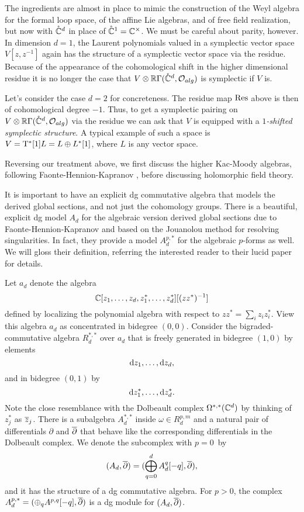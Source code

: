 \documentclass[11pt]{amsart}
\begin{document}
The ingredients are almost in place to mimic the construction of the Weyl algebra for the formal loop space, of the affine Lie algebras, and of free field realization, but now with $\mathring{\mathbb C}^d$ in place of $\mathring{\mathbb C}^1 = \mathbb C^\times$.
We must be careful about parity, however. 
In dimension $d = 1$, the Laurent polynomials valued in a symplectic vector space $V[z,z^{-1}]$ again has the structure of a symplectic vector space via the residue. 
Because of the appearance of the cohomological shift in the higher dimensional residue it is no longer the case that $V \otimes \mathbb R\Gamma(\mathring{\mathbb C}^d, \mathcal O_{alg})$ is symplectic if $V$ is.

Let's consider the case $d = 2$ for concreteness. 
The residue map ${\rm Res}$ above is then of cohomological degree $-1$. 
Thus, to get a symplectic pairing on $V \otimes \mathbb R\Gamma(\mathring{\mathbb C}^d, \mathcal O_{alg})$ via the residue we can ask that $V$ is equipped with a {\em $1$-shifted symplectic structure}. 
A typical example of such a space is $V = {\rm T}^*[1] L = L \oplus L^*[1]$, where $L$ is any vector space.

Reversing our treatment above, we first discuss the higher Kac-Moody algebras, 
following Faonte-Hennion-Kapranov \cite{FHK},
before discussing holomorphic field theory.

It is important to have an explicit dg commutative algebra that models the derived global sections,
and not just the cohomology groups.
There is a beautiful, explicit dg model $A_d$ for the algebraic version derived global sections due to Faonte-Hennion-Kapranov \cite{FHK} and based on the Jouanolou method for resolving singularities. 
In fact, they provide a model $A^{p,*}_d$ for the algebraic $p$-forms as well.
We will gloss their definition, referring the interested reader to their lucid paper for details.

Let $a_d$ denote the algebra  
\[
\mathbb C[z_1,\ldots,z_d, z_1^*,\ldots,z_d^*][(z z^*)^{-1}]
\]
defined by localizing the polynomial algebra with respect to $zz^* = \sum_i z_i z^*_i$.
View this algebra $a_d$ as concentrated in bidegree $(0,0)$.
Consider the bigraded-commutative algebra $R^{*,*}_d$ over $a_d$ that is freely generated in bidegree $(1,0)$ by elements
\[
{\rm d} z_1,\ldots , {\rm d} z_d,
\] 
and in bidegree $(0,1)$ by
\[
{\rm d} z_1^*,\ldots, {\rm d} z_d^*.
\]
Note the close resemblance with the Dolbeault complex $\Omega^{*,*}(\mathbb C^d)$ by thinking of $z_j^*$ as ${\overline{z}}_j$.
There is a subalgebra $A^{*,*}_d$ inside $\omega \in R^{p,m}_d$ and a natural pair of differentials $\partial$ and ${\overline{\partial}}$ that behave like the corresponding differentials in the Dolbeault complex.
We denote the subcomplex with $p=0$~by 
\[
(A_d, {\overline{\partial}}) = (\bigoplus_{q = 0}^d A_d^{q}[-q], {\overline{\partial}}),
\] 
and it has the structure of a dg commutative algebra.
For $p>0$, the complex $A^{p,*}_d = (\oplus_q A^{p,q}[-q], {\overline{\partial}})$ is a dg module for $(A_d, {\overline{\partial}})$.
\end{document}
